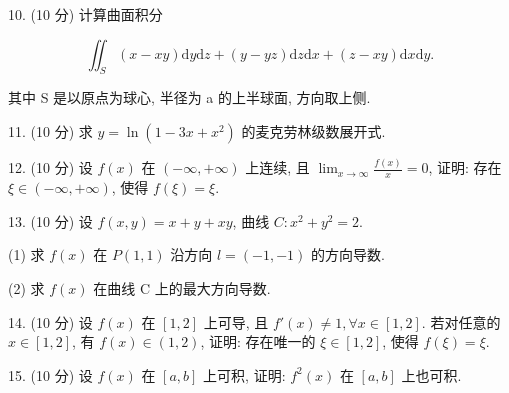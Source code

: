 \documentclass{examcollection}
\renewcommand{\displayformula}[1]{\[#1\]}
\begin{document}
{\begin{minipage}{\textwidth}
10. (10 分) 计算曲面积分\par
\displayformula{\iint_ {S} (x - x y) \mathrm{d} y \mathrm{d} z + (y - y z) \mathrm{d} z \mathrm{d} x + (z - x y) \mathrm{d} x \mathrm{d} y.}\par
其中 S 是以原点为球心, 半径为 a 的上半球面, 方向取上侧.\par
11. (10 分) 求 $y = \ln (1 - 3x + x^2)$ 的麦克劳林级数展开式.\par
12. (10 分) 设 $f(x)$ 在 $(- \infty, + \infty)$ 上连续, 且 $\lim_{x \to \infty} \frac{f(x)}{x} = 0$, 证明: 存在 $\xi \in (-\infty, + \infty)$, 使得 $f(\xi) = \xi$.\par
13. (10 分) 设 $f(x, y) = x + y + xy$, 曲线 $C: x^2 + y^2 = 2$.\par
(1) 求 $f(x)$ 在 $P(1,1)$ 沿方向 $l = (-1, -1)$ 的方向导数.\par
(2) 求  $f(x)$  在曲线 C 上的最大方向导数.\par
14. (10 分) 设 $f(x)$ 在 $[1,2]$ 上可导, 且 $f'(x) \neq 1, \forall x \in [1,2]$. 若对任意的 $x \in [1,2]$, 有 $f(x) \in (1,2)$, 证明: 存在唯一的 $\xi \in [1,2]$, 使得 $f(\xi) = \xi$.\par
15. (10 分) 设 $f(x)$ 在 $[a, b]$ 上可积, 证明: $f^2(x)$ 在 $[a, b]$ 上也可积.\par
\end{minipage}}
\ifdim\dimexpr\ht\proofbox+\dp\proofbox\relax>\textheight
\noindent\resizebox{!}{\textheight}{\usebox{\proofbox}}\else\noindent\usebox{\proofbox}\fi\clearpage
\end{document}
